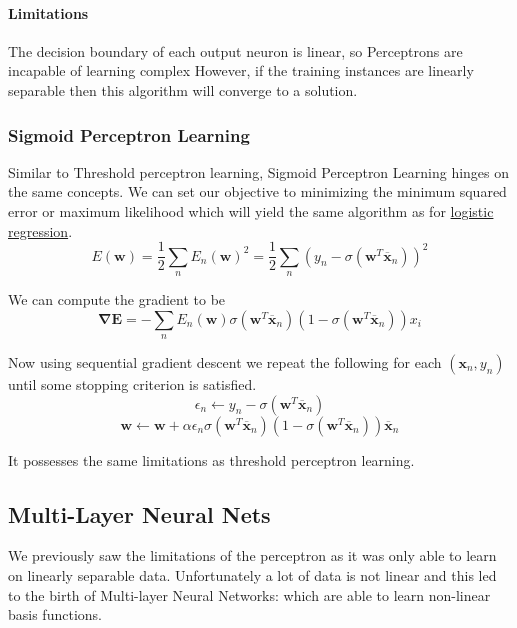 \documentclass[12pt]{article}
\begin{document}
            \paragraph{Limitations}
                The decision boundary of each output neuron is linear, so Perceptrons are incapable of learning complex
                However, if the training instances are linearly separable then this algorithm will converge to a solution.
        
        \subsubsection{Sigmoid Perceptron Learning}
            Similar to Threshold perceptron learning, Sigmoid Perceptron Learning hinges on the same concepts. We can
            set our objective to minimizing the minimum squared error or maximum likelihood which will yield the same
            algorithm as for \hyperref[sec:LogisticRegression]{logistic regression}. 
            $$ E(\boldsymbol{w}) = \frac{1}{2} \sum_n E_n (\boldsymbol{w})^2 = \frac{1}{2} \sum_n (y_n -
            \sigma(\boldsymbol{w}^T\overline{\boldsymbol{x}}_n))^2 $$

            We can compute the gradient to be
            $$ \boldsymbol{\nabla E} = -\sum_n E_n(\boldsymbol{w})\sigma(\boldsymbol{w}^T
            \overline{\boldsymbol{x}}_n)(1-\sigma(\boldsymbol{w}^T \overline{\boldsymbol{x}}_n))x_i $$

            Now using sequential gradient descent we repeat the following for each $(\boldsymbol{x}_n, y_n)$ until some
            stopping criterion is satisfied. 
            $$ \epsilon_n \leftarrow y_n - \sigma(\boldsymbol{w}^T \overline{\boldsymbol{x}}_n) $$
            $$ \boldsymbol{w} \leftarrow \boldsymbol{w} + \alpha \epsilon_n \sigma(\boldsymbol{w}^T
            \overline{\boldsymbol{x}}_n) (1 - \sigma(\boldsymbol{w}^T
            \overline{\boldsymbol{x}}_n))\overline{\boldsymbol{x}}_n $$

            It possesses the same limitations as threshold perceptron learning.

    \subsection{Multi-Layer Neural Nets}
        We previously saw the limitations of the perceptron as it was only able to learn on linearly separable data.
        Unfortunately a lot of data is not linear and this led to the birth of Multi-layer Neural Networks:
        which are able to learn non-linear basis functions.
\end{document}
